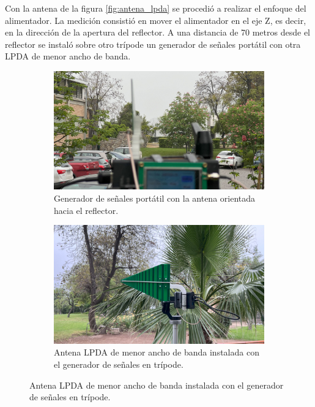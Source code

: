 Con la antena de la figura \ref{fig:antena_lpda} se procedió a realizar el enfoque del alimentador. La medición consistió en mover el alimentador en el eje Z, es decir, en la dirección de la apertura del reflector. A una distancia de 70 metros desde el reflector se instaló sobre otro trípode un generador de señales portátil con otra LPDA de menor ancho de banda.\\

\begin{figure}[h!]
    \centering
    \begin{subfigure}{0.45\textwidth}
        \includegraphics[width=\textwidth]{img/enfoque_cerca}
        \caption{Generador de señales portátil con la antena orientada hacia el reflector.}
        \label{fig:generador1}
    \end{subfigure}
    \begin{subfigure}{0.45\textwidth}
        \includegraphics[width=\textwidth]{img/enfoque_cerca1}
        \caption{Antena LPDA de menor ancho de banda instalada con el generador de señales en trípode.}
        \label{fig:antena_lpda1}
    \end{subfigure}
\end{figure}

